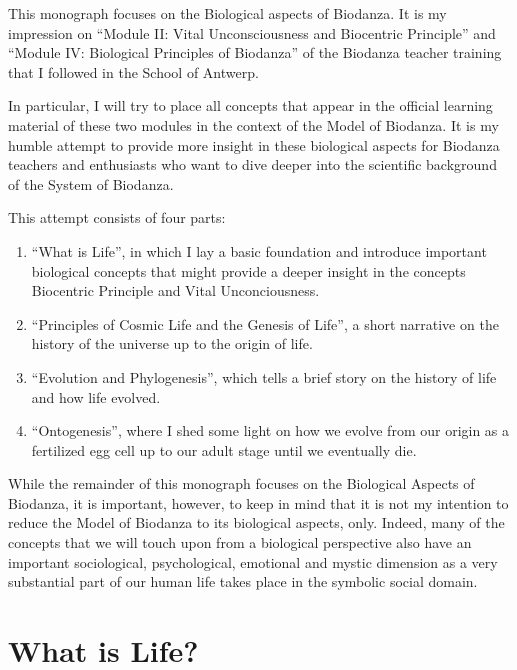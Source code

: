 \documentclass[
  11pt,
]{book}
\begin{document}
This monograph focuses on the Biological aspects of Biodanza. It is my impression on ``Module II: Vital Unconsciousness and Biocentric Principle'' and ``Module IV: Biological Principles of Biodanza'' of the Biodanza teacher training that I followed in the School of Antwerp.

In particular, I will try to place all concepts that appear in the official learning material of these two modules in the context of the Model of Biodanza. It is my humble attempt to provide more insight in these biological aspects for Biodanza teachers and enthusiasts who want to dive deeper into the scientific background of the System of Biodanza.

This attempt consists of four parts:

\begin{enumerate}
\def\labelenumi{\arabic{enumi}.}
\item
  ``What is Life'', in which I lay a basic foundation and introduce important biological concepts that might provide a deeper insight in the concepts Biocentric Principle and Vital Unconciousness.
\item
  ``Principles of Cosmic Life and the Genesis of Life'', a short narrative on the history of the universe up to the origin of life.
\item
  ``Evolution and Phylogenesis'', which tells a brief story on the history of life and how life evolved.
\item
  ``Ontogenesis'', where I shed some light on how we evolve from our origin as a fertilized egg cell up to our adult stage until we eventually die.
\end{enumerate}

While the remainder of this monograph focuses on the Biological Aspects of Biodanza, it is important, however, to keep in mind that it is not my intention to reduce the Model of Biodanza to its biological aspects, only. Indeed, many of the concepts that we will touch upon from a biological perspective also have an important sociological, psychological, emotional and mystic dimension as a very substantial part of our human life takes place in the symbolic social domain.

\hypertarget{what-is-life}{%
\chapter{What is Life?}\label{what-is-life}}
\end{document}
